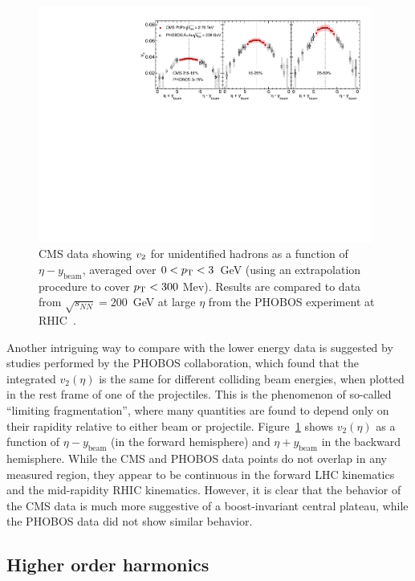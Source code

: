 \begin{figure}[!tb]
\begin{center}
\includegraphics[width=0.98\textwidth]{flowcorrelations_figs/v2_etashifted_3cen_PHOBOS.pdf}
\caption[]{
CMS data showing $\mbox{$v_2$}$ for unidentified hadrons as a function of $\eta - y_{\mathrm{beam}}$, averaged over $0 <\mbox{$p_{\mathrm{T}}$} < 3$~GeV (using an extrapolation procedure to cover $\mbox{$p_{\mathrm{T}}$} <300$ Mev).
Results are compared to data from $\sqrt{s_{NN}}=200$~GeV
at large $\eta$ from the PHOBOS experiment at RHIC~\cite{Chatrchyan:2012ta}.
}
\label{fig:pas:fc:limfrag}
\end{center}
\end{figure}
Another intriguing way to compare with the lower energy data is suggested by studies performed by the PHOBOS
collaboration, which found that the integrated $v_2(\eta)$ is the same for different colliding beam energies,
when plotted in the rest frame of one of the projectiles.  This is the phenomenon of so-called
``limiting fragmentation'', where many quantities are found to depend only on their rapidity relative to either
beam or projectile.
Figure~\ref{fig:pas:fc:limfrag} shows $v_2(\eta)$ as a function of $\eta - y_{\mathrm{beam}}$ (in the forward
hemisphere) and $\eta + y_{\mathrm{beam}}$ in the backward hemisphere.
While the CMS and PHOBOS data points do not overlap in any measured region, they appear to be continuous
in the forward LHC kinematics and the mid-rapidity RHIC kinematics.
However, it is clear that the behavior of the CMS data is much more suggestive of a boost-invariant central
plateau, while the PHOBOS data did not show similar behavior.

\subsection{Higher order harmonics}

